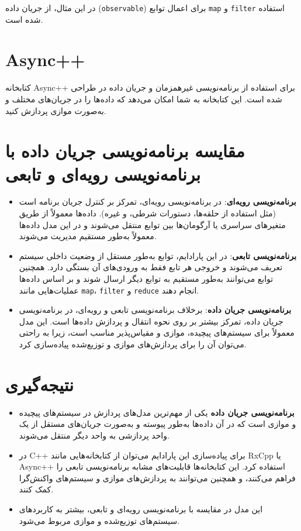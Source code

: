 \documentclass[12pt, a4paper]{report}
\begin{document}
در این مثال، از جریان داده (\texttt{observable}) برای اعمال توابع \texttt{map} و \texttt{filter} استفاده شده است.

\section{Async++}
کتابخانه Async++ برای استفاده از برنامه‌نویسی غیرهمزمان و جریان داده در  طراحی شده است. این کتابخانه به شما امکان می‌دهد که داده‌ها را در جریان‌های مختلف و به‌صورت موازی پردازش کنید.

\section{مقایسه برنامه‌نویسی جریان داده با برنامه‌نویسی رویه‌ای و تابعی}
\begin{itemize}
	\item \textbf{برنامه‌نویسی رویه‌ای}: در برنامه‌نویسی رویه‌ای، تمرکز بر کنترل جریان برنامه است (مثل استفاده از حلقه‌ها، دستورات شرطی، و غیره). داده‌ها معمولاً از طریق متغیرهای سراسری یا آرگومان‌ها بین توابع منتقل می‌شوند و در این مدل داده‌ها معمولاً به‌طور مستقیم مدیریت می‌شوند.
	\item \textbf{برنامه‌نویسی تابعی}: در این پارادایم، توابع به‌طور مستقل از وضعیت داخلی سیستم تعریف می‌شوند و خروجی هر تابع فقط به ورودی‌های آن بستگی دارد. همچنین توابع می‌توانند به‌طور مستقیم به توابع دیگر ارسال شوند و بر اساس داده‌ها عملیات‌هایی مانند \texttt{map}، \texttt{filter} و \texttt{reduce} انجام دهند.
	\item \textbf{برنامه‌نویسی جریان داده}: برخلاف برنامه‌نویسی تابعی و رویه‌ای، در برنامه‌نویسی جریان داده، تمرکز بیشتر بر روی نحوه انتقال و پردازش داده‌ها است. این مدل معمولاً برای سیستم‌های پیچیده، موازی و مقیاس‌پذیر مناسب است، زیرا به راحتی می‌توان آن را برای پردازش‌های موازی و توزیع‌شده پیاده‌سازی کرد.
\end{itemize}

\section{نتیجه‌گیری}
\begin{itemize}
	\item \textbf{برنامه‌نویسی جریان داده} یکی از مهم‌ترین مدل‌های پردازش در سیستم‌های پیچیده و موازی است که در آن داده‌ها به‌طور پیوسته و به‌صورت جریان‌های مستقل از یک واحد پردازشی به واحد دیگر منتقل می‌شوند.
	\item در C++ برای پیاده‌سازی این پارادایم می‌توان از کتابخانه‌هایی مانند RxCpp یا Async++ استفاده کرد. این کتابخانه‌ها قابلیت‌های مشابه برنامه‌نویسی تابعی را فراهم می‌کنند، و همچنین می‌توانند به پردازش‌های موازی و سیستم‌های واکنش‌گرا کمک کنند.
	\item این مدل در مقایسه با برنامه‌نویسی رویه‌ای و تابعی، بیشتر به کاربردهای سیستم‌های توزیع‌شده و موازی مربوط می‌شود.
\end{itemize}
\end{document}
